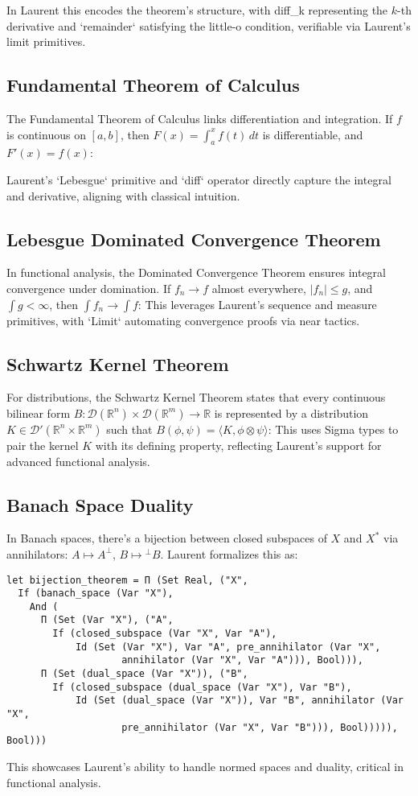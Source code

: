 \documentclass[12pt,twoside,draft]{cmpart}
\begin{document}
In Laurent this encodes the theorem’s structure, with diff\_k
representing the $k$-th derivative and `remainder` satisfying
the little-o condition, verifiable via Laurent’s limit primitives.

\subsection{Fundamental Theorem of Calculus}
The Fundamental Theorem of Calculus links differentiation and integration.
If $f$ is continuous on $[a, b]$, then $F(x) = \int_a^x f(t) \, dt$ is
differentiable, and $F'(x) = f(x)$:

Laurent’s `Lebesgue` primitive and `diff` operator directly capture the integral and derivative, aligning with classical intuition.

\subsection{Lebesgue Dominated Convergence Theorem}
In functional analysis, the Dominated Convergence Theorem ensures integral convergence under domination. If $f_n \to f$ almost everywhere, $|f_n| \leq g$, and $\int g < \infty$, then $\int f_n \to \int f$:
This leverages Laurent’s sequence and measure primitives, with `Limit` automating convergence proofs via near tactics.

\subsection{Schwartz Kernel Theorem}
For distributions, the Schwartz Kernel Theorem states that every continuous bilinear form $B : \mathcal{D}(\mathbb{R}^n) \times \mathcal{D}(\mathbb{R}^m) \to \mathbb{R}$ is represented by a distribution $K \in \mathcal{D}'(\mathbb{R}^n \times \mathbb{R}^m)$ such that $B(\phi, \psi) = \langle K, \phi \otimes \psi \rangle$:
This uses Sigma types to pair the kernel $K$ with its defining property, reflecting Laurent’s support for advanced functional analysis.

\subsection{Banach Space Duality}
In Banach spaces, there’s a bijection between closed subspaces of $X$ and $X^*$ via annihilators: $A \mapsto A^\perp$, $B \mapsto {}^\perp B$. Laurent formalizes this as:
\begin{verbatim}
let bijection_theorem = Π (Set Real, ("X",
  If (banach_space (Var "X"),
    And (
      Π (Set (Var "X"), ("A",
        If (closed_subspace (Var "X", Var "A"),
            Id (Set (Var "X"), Var "A", pre_annihilator (Var "X",
                    annihilator (Var "X", Var "A"))), Bool))),
      Π (Set (dual_space (Var "X")), ("B",
        If (closed_subspace (dual_space (Var "X"), Var "B"),
            Id (Set (dual_space (Var "X")), Var "B", annihilator (Var "X",
                    pre_annihilator (Var "X", Var "B"))), Bool))))), Bool)))
\end{verbatim}
This showcases Laurent’s ability to handle normed spaces and duality, critical in functional analysis.
\end{document}
